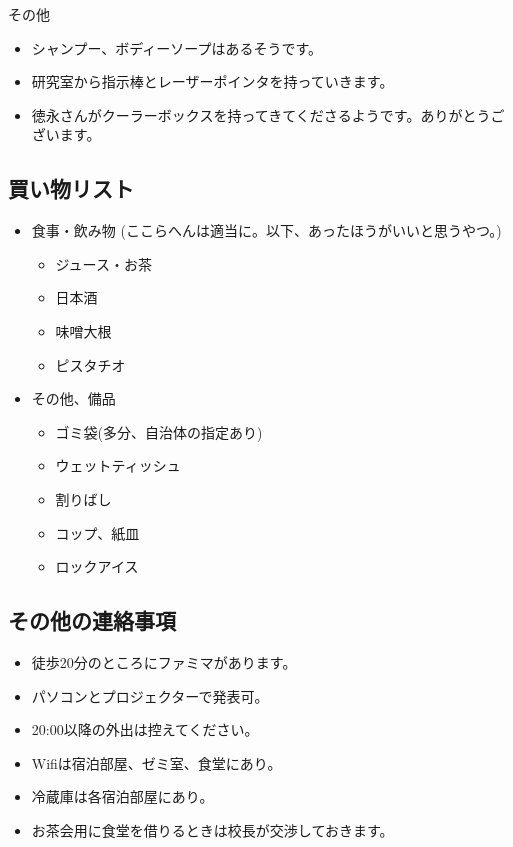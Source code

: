 \documentclass[unicode,a4paper,11pt]{ltjsarticle}
\begin{document}
その他

\begin{itemize}
      \item
            シャンプー、ボディーソープはあるそうです。
      \item
            研究室から指示棒とレーザーポインタを持っていきます。
      \item
            徳永さんがクーラーボックスを持ってきてくださるようです。ありがとうございます。
\end{itemize}

\subsection*{買い物リスト}

\begin{itemize}
      \item
            食事・飲み物 (ここらへんは適当に。以下、あったほうがいいと思うやつ。)
            \begin{itemize}
                  \item
                        ジュース・お茶
                  \item
                        日本酒
                  \item
                        味噌大根
                  \item
                        ピスタチオ
            \end{itemize}
      \item
            その他、備品
            \begin{itemize}
                  \item
                        ゴミ袋(多分、自治体の指定あり)
                  \item
                        ウェットティッシュ
                  \item
                        割りばし
                  \item
                        コップ、紙皿
                  \item
                        ロックアイス
            \end{itemize}
\end{itemize}

\subsection*{その他の連絡事項}

\begin{itemize}
      \item
            徒歩20分のところにファミマがあります。
      \item
            パソコンとプロジェクターで発表可。
      \item
            20:00以降の外出は控えてください。
      \item
            Wifiは宿泊部屋、ゼミ室、食堂にあり。
      \item
            冷蔵庫は各宿泊部屋にあり。
      \item
            お茶会用に食堂を借りるときは校長が交渉しておきます。
\end{itemize}
\end{document}
